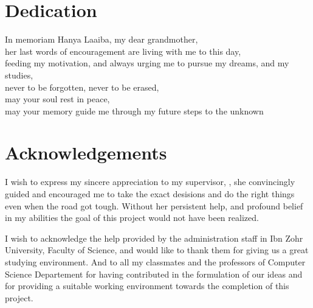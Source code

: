 

\chapter*{Dedication}
\thispagestyle{empty}
%
\vspace*{\fill}

\begin{center}
  In memoriam Hanya Laaiba, my dear grandmother, ~ \\
  her last words of encouragement are living with me to this day, ~ \\
  feeding my motivation, and always urging me to pursue my dreams, and my studies, ~\\
  never to be forgotten, never to be erased, ~ \\
  may your soul rest in peace, ~ \\
  may your memory guide me through my future steps to the unknown ~ \\


\end{center}
%
\vspace*{\fill}

%
%
%
%
%
%
\cleardoublepage%
\chapter*{Acknowledgements}
\thispagestyle{empty}
%

I wish to express my sincere appreciation to my supervisor, \mentor, she convincingly guided and encouraged me to take the exact desisions and do the right things even when the road got tough. Without her persistent help, and profound belief in my abilities the goal of this project would not have been realized.

I wish to acknowledge the help provided by the administration staff in Ibn Zohr University, Faculty of Science, and would like to thank them for giving us a great studying environment. And to all my classmates and the professors of Computer Science Departement for having contributed in the formulation of our ideas and for providing a suitable working environment towards the completion of this project.

